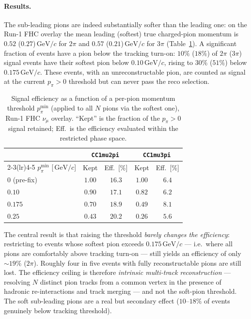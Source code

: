 \documentclass[11pt,a4paper]{article}
\newcommand{\GeVc}{\,\text{GeV}\!/c}
\begin{document}
\paragraph{Results.} The sub-leading pions are indeed substantially softer than the
leading one: on the Run-1 FHC overlay the mean leading (softest) true charged-pion
momentum is $0.52$ ($0.27$)$\GeVc$ for $2\pi$ and $0.57$ ($0.21$)$\GeVc$ for $3\pi$
(Table~\ref{tab:mp_thr}). A significant fraction of events have a pion below the
tracking turn-on: $10\%$ ($18\%$) of $2\pi$ ($3\pi$) signal events have their softest
pion below $0.10\GeVc$, rising to $30\%$ ($51\%$) below $0.175\GeVc$. These events, with
an unreconstructable pion, are counted as signal at the current $p_\pi>0$ threshold but
can never pass the reco selection.

\begin{table}[H]
  \centering
  \caption{Signal efficiency as a function of a per-pion momentum threshold
    $p_\pi^{\min}$ (applied to all $N$ pions via the softest one), Run-1 FHC $\nu_\mu$
    overlay. ``Kept'' is the fraction of the $p_\pi>0$ signal retained; Eff.\ is the
    efficiency evaluated within the restricted phase space.}
  \label{tab:mp_thr}
  \small
  \begin{tabular}{lcccc}
    \toprule
    & \multicolumn{2}{c}{\texttt{CC1mu2pi}} & \multicolumn{2}{c}{\texttt{CC1mu3pi}} \\
    \cmidrule(lr){2-3}\cmidrule(lr){4-5}
    $p_\pi^{\min}$ [$\GeVc$] & Kept & Eff.\ [\%] & Kept & Eff.\ [\%] \\
    \midrule
    $0$ (pre-fix)  & $1.00$ & $16.3$ & $1.00$ & $6.4$ \\
    $0.10$        & $0.90$ & $17.1$ & $0.82$ & $6.2$ \\
    $0.175$       & $0.70$ & $18.9$ & $0.49$ & $8.1$ \\
    $0.25$        & $0.43$ & $20.2$ & $0.26$ & $5.6$ \\
    \bottomrule
  \end{tabular}
\end{table}

The central result is that raising the threshold \emph{barely changes the efficiency}:
restricting to events whose softest pion exceeds $0.175\GeVc$ --- i.e.\ where all pions
are comfortably above tracking turn-on --- still yields an efficiency of only $\sim\!19\%$
($2\pi$). Roughly four in five events with fully reconstructable pions are still lost. The
efficiency ceiling is therefore \emph{intrinsic multi-track reconstruction} --- resolving
$N$ distinct pion tracks from a common vertex in the presence of hadronic re-interactions
and track merging --- and not the soft-pion threshold. The soft sub-leading pions are a
real but secondary effect ($10$--$18\%$ of events genuinely below tracking threshold).
\end{document}
